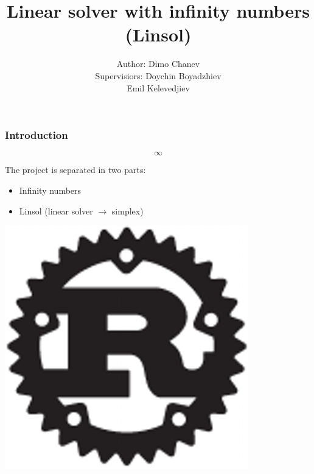 \documentclass[12pt]{beamer}
\begin{document}
	
	\author[Dimo]{
		\begin{table}[]
			\begin{tabular}{rl}
				\normalsize{Author:    } & \normalsize{Dimo Chanev} \\
				\scriptsize{Supervisiors:     } & \scriptsize{Doychin Boyadzhiev} \\
												& \scriptsize{Emil Kelevedjiev}
			\end{tabular}
		\end{table}
	}
	\title[Linear solver with infinity numbers (Linsol)]{\textbf{Linear solver with infinity numbers (Linsol)}}
	
	\begin{frame}
		\titlepage
	\end{frame}

	\begin{frame}
		\frametitle{Introduction}
		\begin{center}
			\Huge{$$\infty$$}
		\end{center}
		\begin{block}{}
			The project is separated in two parts:
            \begin{itemize}
            \item Infinity numbers
            \item Linsol (linear solver $\to$ simplex)
            \end{itemize}
		\end{block}
		\vspace{0.1cm}
		\begin{center}
			\includegraphics[scale=0.1]{rust.png}
		\end{center}
		\vspace{1.1cm}
	\end{frame}
\end{document}

